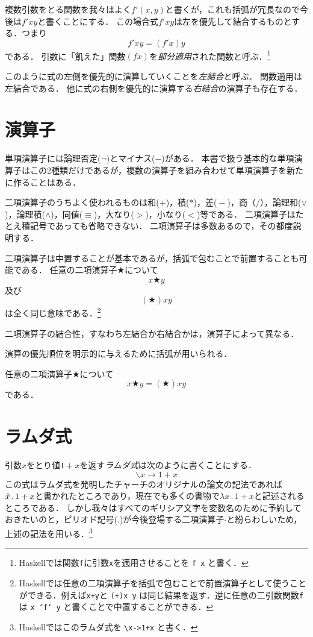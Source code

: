 \documentclass[twocolumn]{jsbook}
\newcommand{\keyword}[1]{\emph{#1}}
\newcommand{\code}[1]{\texttt{#1}}
\newenvironment{point}{\begin{screen}}{\end{screen}}
\newcommand{\lambdasym}{\backslash}
\newcommand{\lambdadot}{\rightarrow}
\newcommand{\lambdaexp}[2]{\lambdasym#1\lambdadot#2}
\newcommand{\binaryeq}{\equiv}
\newcommand{\binaryl}{<}
\newcommand{\binaryg}{>}
\newcommand{\binaryadd}{+}
\newcommand{\binarysub}{-}
\newcommand{\binarymultiply}{*}
\newcommand{\binarydivide}{/}
\newcommand{\binaryor}{\vee}
\newcommand{\binaryand}{\wedge}
\newcommand{\mathbinaryop}{\bigstar}
\begin{document}
複数引数をとる関数を我々はよく$f'(x,y)$と書くが，これも括弧が冗長なので今後は$f'xy$と書くことにする．
この場合式$f'xy$は左を優先して結合するものとする．つまり$$f'xy=(f'x)y$$である．
引数に「飢えた」関数$(fx)$を\keyword{部分適用}された関数と呼ぶ．\footnote{Haskellでは関数\code{f}に引数\code{x}を適用させることを \code{f x} と書く．}

このように式の左側を優先的に演算していくことを\keyword{左結合}と呼ぶ．
関数適用は左結合である．
他に式の右側を優先的に演算する\keyword{右結合}の演算子も存在する．

\section{演算子}

単項演算子には論理否定($\neg$)とマイナス($-$)がある．
本書で扱う基本的な単項演算子はこの2種類だけであるが，複数の演算子を組み合わせて単項演算子を新たに作ることはある．

二項演算子のうちよく使われるものは和($\binaryadd$)，積($\binarymultiply$)，差(${}\binarysub{}$)，商（${}\binarydivide{}$），論理和($\binaryor$)，論理積($\binaryand$)，同値($\binaryeq$)，大なり($\binaryg$)，小なり($\binaryl$)等である．
二項演算子はたとえ積記号であっても省略できない．
二項演算子は多数あるので，その都度説明する．

二項演算子は中置することが基本であるが，括弧で包むことで前置することも可能である．
任意の二項演算子$\mathbinaryop$について$$x\mathbinaryop y$$及び$$(\mathbinaryop)xy$$は全く同じ意味である．\footnote{Haskellでは任意の二項演算子を括弧で包むことで前置演算子として使うことができる．例えば\code{x+y}と \code{(+)x y} は同じ結果を返す．逆に任意の二引数関数\code{f}は \code{x `f` y} と書くことで中置することができる．}

二項演算子の結合性，すなわち左結合か右結合かは，演算子によって異なる．

演算の優先順位を明示的に与えるために括弧が用いられる．

\begin{point}
任意の二項演算子$\mathbinaryop$について$$x\mathbinaryop y=(\mathbinaryop)xy$$である．
\end{point}

\section{ラムダ式}
引数$x$をとり値$1+x$を返す\keyword{ラムダ式}は次のように書くことにする．
$$\lambdaexp{x}{1+x}$$
この式はラムダ式を発明したチャーチのオリジナルの論文の記法であれば$\Hat x\,.\,1+x$と書かれたところであり，現在でも多くの書物で$\lambda x\,.\,1+x$と記述されるところである．
しかし我々はすべてのギリシア文字を変数名のために予約しておきたいのと，ピリオド記号($.$)が今後登場する二項演算子$\cdot$と紛らわしいため，上述の記法を用いる．\footnote{Haskellではこのラムダ式を \code{\textbackslash x->1+x} と書く．}
\end{document}
